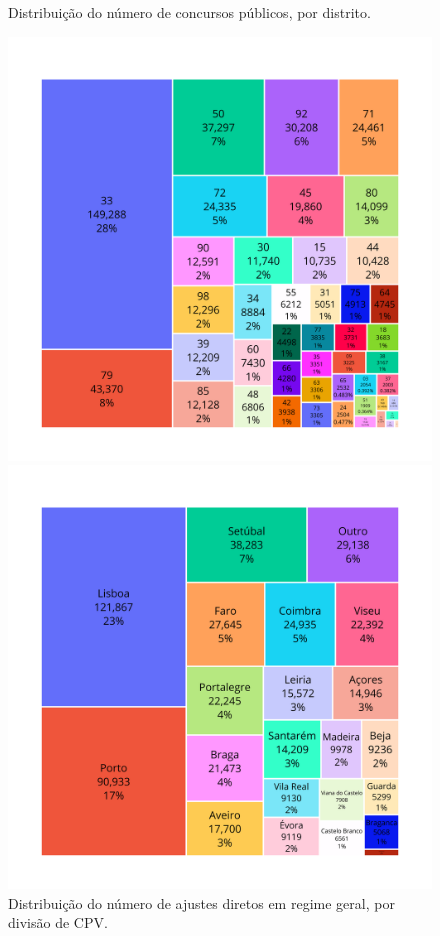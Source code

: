 \begin{figure}[H]
\begin{minipage}[t]{0.49\textwidth}
		\caption{Distribuição do número de concursos públicos, por distrito.}
		\label{fig:cploc}
	\end{minipage}
	
	\vspace{1em}
	
	\begin{minipage}[t]{0.49\textwidth}
		\centering
		\includegraphics[width=\textwidth]{imagens/treemap_contratos_adir.png}
		\caption{Distribuição do número de ajustes diretos em regime geral, por divisão de CPV.}
		\label{fig:adcpv}
	\end{minipage}
	\hfill
	\begin{minipage}[t]{0.49\textwidth}
		\centering
		\includegraphics[width=\textwidth]{imagens/treemap_distritos_adir.png}

\end{minipage}
\end{figure}
